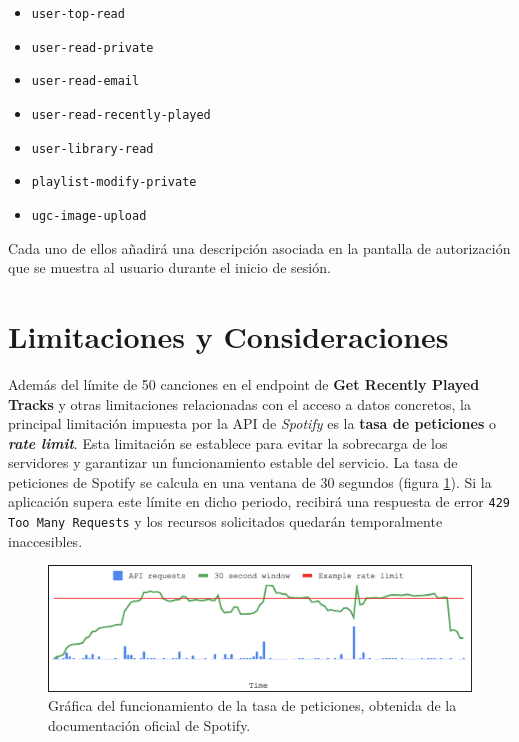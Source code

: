 \setlength{\columnsep}{-1em} %
\begin{multicols}{2} %
    \begin{itemize}
        \setlength{\itemsep}{0.3em} %
        \setlength{\topsep}{0.5em}  %
        \setlength{\parsep}{0pt}    %
        \setlength{\parskip}{0pt}   %
        \item \texttt{user-top-read}
        \item \texttt{user-read-private}
        \item \texttt{user-read-email}
        \item \texttt{user-read-recently-played}
        \item \texttt{user-library-read}
        \item \texttt{playlist-modify-private}
        \item \texttt{ugc-image-upload}
    \end{itemize}
\end{multicols}

Cada uno de ellos añadirá una descripción asociada en la pantalla de autorización que se muestra al usuario durante el inicio de sesión.

\section{Limitaciones y Consideraciones}

Además del límite de 50 canciones en el endpoint de \textbf{Get Recently Played Tracks} y otras limitaciones relacionadas con el acceso a datos concretos, la principal limitación impuesta por la API de \textit{Spotify} es la \textbf{tasa de peticiones} o \textit{\textbf{rate limit}}. Esta limitación se establece para evitar la sobrecarga de los servidores y garantizar un funcionamiento estable del servicio. La tasa de peticiones de Spotify se calcula en una ventana de 30 segundos (figura \ref{fig:rate_limit}). Si la aplicación supera este límite en dicho periodo, recibirá una respuesta de error \texttt{429 Too Many Requests} y los recursos solicitados quedarán temporalmente inaccesibles.

\begin{figure}[H]
    \centering
    \includegraphics[width=\textwidth]{figures/rate_limit.png}
    \caption{Gráfica del funcionamiento de la tasa de peticiones, obtenida de la documentación oficial de Spotify.}
    \label{fig:rate_limit}
\end{figure}

